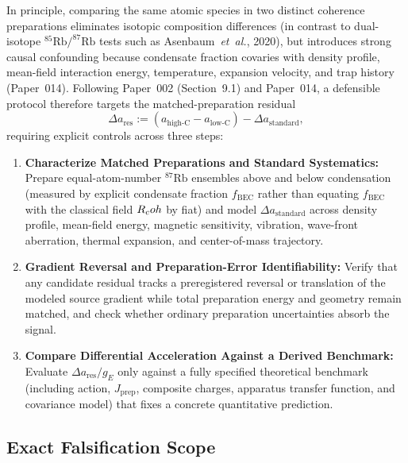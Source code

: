 In principle, comparing the same atomic species in two distinct coherence preparations eliminates isotopic composition differences (in contrast to dual-isotope $^{85}\mathrm{Rb}/^{87}\mathrm{Rb}$ tests such as Asenbaum~\emph{et~al.}, 2020), but introduces strong causal confounding because condensate fraction covaries with density profile, mean-field interaction energy, temperature, expansion velocity, and trap history (Paper~014). Following Paper~002 (Section~9.1) and Paper~014, a defensible protocol therefore targets the matched-preparation residual
\begin{equation}
\Delta a_{\mathrm{res}} := (a_{\mathrm{high\text{-}C}} - a_{\mathrm{low\text{-}C}}) - \Delta a_{\mathrm{standard}},
\label{eq:bec_matched_residual}
\end{equation}
requiring explicit controls across three steps:
\begin{enumerate}
    \item \textbf{Characterize Matched Preparations and Standard Systematics:} Prepare equal-atom-number $^{87}\mathrm{Rb}$ ensembles above and below condensation (measured by explicit condensate fraction $f_{\mathrm{BEC}}$ rather than equating $f_{\mathrm{BEC}}$ with the classical field $R_coh$ by fiat) and model $\Delta a_{\mathrm{standard}}$ across density profile, mean-field energy, magnetic sensitivity, vibration, wave-front aberration, thermal expansion, and center-of-mass trajectory.
    \item \textbf{Gradient Reversal and Preparation-Error Identifiability:} Verify that any candidate residual tracks a preregistered reversal or translation of the modeled source gradient while total preparation energy and geometry remain matched, and check whether ordinary preparation uncertainties absorb the signal.
    \item \textbf{Compare Differential Acceleration Against a Derived Benchmark:} Evaluate $\Delta a_{\mathrm{res}}/g_E$ only against a fully specified theoretical benchmark (including action, $J_{\mathrm{prep}}$, composite charges, apparatus transfer function, and covariance model) that fixes a concrete quantitative prediction.
\end{enumerate}

\subsection{Exact Falsification Scope}

